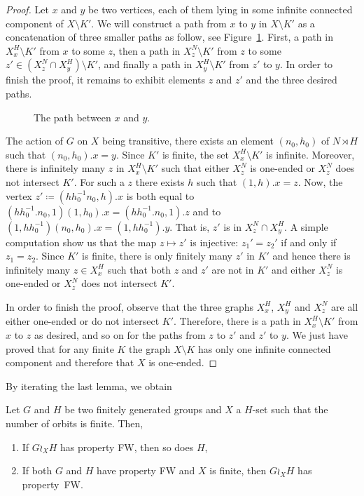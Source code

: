 \begin{proof}
Let $x$ and $y$ be two vertices, each of them lying in some infinite connected component of $X\setminus K'$.
We will construct a path from $x$ to $y$ in $X\setminus K'$ as a concatenation of three smaller paths as follow, see Figure~\ref{Figure:PathSemiDirect}.
First, a path in $X_x^H\setminus K'$ from $x$ to some $z$, then a path in $X_z^N\setminus K'$ from $z$ to some $z'\in (X_z^N\cap X_y^H)\setminus K'$, and finally a path in $X_y^H\setminus K'$ from $z'$ to $y$.
In order to finish the proof, it remains to exhibit elements $z$ and $z'$ and the three desired paths.
%
%
\begin{figure}[htbp]\centering
\scalebox{0.7}{
}
\caption{The path between $x$ and $y$.}
\label{Figure:PathSemiDirect}
\end{figure}
%
%

The action of $G$ on $X$ being transitive, there exists an element $(n_0,h_0)$ of $N \rtimes H$ such that $(n_0,h_0).x = y$.
Since $K'$ is finite, the set $X_x^H\setminus K'$ is infinite.
Moreover, there is infinitely many $z$ in $X_x^H\setminus K'$ such that either $X_z^N$ is one-ended or $X_z^N$ does not intersect $K'$.
For such a $z$ there exists $h$ such that $(1,h).x=z$.
Now, the vertex $z'\coloneqq(hh_0^{-1}n_0,h).x$ is both equal to $(hh_0^{-1}.n_0,1)(1,h_0).x=(hh_0^{-1}.n_0,1).z$ and to $(1,hh_0^{-1})(n_0,h_0).x=(1,hh_0^{-1}).y$. That is, $z'$ is in $X_z^N\cap X_y^H$.
A simple computation show us that the map $z\mapsto z'$ is injective: $z_1'=z_2'$ if and only if $z_1=z_2$.
Since $K'$ is finite, there is only finitely many $z'$ in $K'$ and hence there is infinitely many $z\in X_x^H$ such that both $z$ and $z'$ are not in $K'$ and either $X_z^N$ is one-ended or $X_z^N$ does not intersect $K'$.

In order to finish the proof, observe that the three graphs $X_x^H$, $X_y^H$ and $X_z^N$ are all either one-ended or do not intersect $K'$.
Therefore, there is a path in $X_x^H\setminus K'$ from $x$ to $z$ as desired, and so on for the paths from $z$ to $z'$ and $z'$ to $y$.
We just have proved that for any finite $K$ the graph $X\setminus K$ has only one infinite connected component and therefore that $X$ is one-ended.
\end{proof}
%
%
By iterating the last lemma, we obtain
%
%
\begin{cor}\label{Cor:Wreath_ends}
Let $G$ and $H$ be two finitely generated groups and $X$ a $H$-set such that the number of orbits is finite. Then,
\begin{enumerate}
\item
If $G\wr_X H$ has property FW, then so does $H$,
\item
If both $G$ and $H$ have property FW and $X$ is finite, then $G\wr_X H$ has property~FW.
\end{enumerate}
\end{cor}
